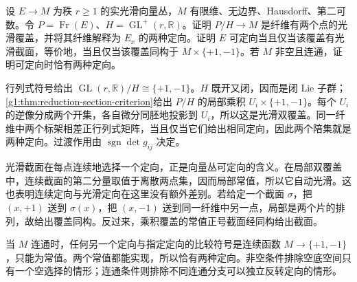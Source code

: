 \begin{exercise}\label{g1:ex:orientation-reduction-cover}
	设 \(E\to M\) 为秩 \(r\geq1\) 的实光滑向量丛，\(M\) 有限维、无边界、Hausdorff、第二可数。令 \(P=\operatorname{Fr}(E)\)、\(H=\operatorname{GL}^+(r,\mathbb R)\)。证明 \(P/H\to M\) 是纤维有两个点的光滑覆盖，并将其纤维解释为 \(E_x\) 的两种定向。证明 \(E\) 可定向当且仅当该覆盖有光滑截面，等价地，当且仅当该覆盖同构于 \(M\times\{+1,-1\}\)。若 \(M\) 非空且连通，证明可定向时恰有两种定向。
\end{exercise}
\begin{solution}
	行列式符号给出 \(\operatorname{GL}(r,\mathbb R)/H\cong\{+1,-1\}\)。\(H\) 既开又闭，因而是闭 Lie 子群；\cref{g1:thm:reduction-section-criterion}给出 \(P/H\) 的局部乘积 \(U_i\times\{+1,-1\}\)。每个 \(U_i\) 的逆像分成两个开集，各自微分同胚地投影到 \(U_i\)，所以这是光滑双覆盖。同一纤维中两个标架相差正行列式矩阵，当且仅当它们给出相同定向，因此两个陪集就是两种定向。过渡作用由 \(\operatorname{sgn}\det g_{ij}\) 决定。

	光滑截面在每点连续地选择一个定向，正是向量丛可定向的含义。在局部双覆盖中，连续截面的第二分量取值于离散两点集，因而局部常值，所以它自动光滑。这也表明连续定向与光滑定向在这里没有额外差别。若给定一个截面 \(\sigma\)，把 \((x,+1)\) 送到 \(\sigma(x)\)，把 \((x,-1)\) 送到同一纤维中另一点，局部是两个片的排列，故给出覆盖同构。反过来，乘积覆盖的常值正号截面经同构给出截面。

	当 \(M\) 连通时，任何另一个定向与指定定向的比较符号是连续函数 \(M\to\{+1,-1\}\)，只能为常值。两个常值都能实现，所以恰有两种定向。非空条件排除空底空间只有一个空选择的情形；连通条件则排除不同连通分支可以独立反转定向的情形。
\end{solution}

